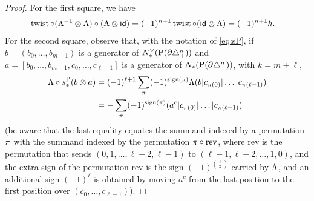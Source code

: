 \begin{proof}
	For the first square, we have
	\begin{align*}
		\operatorname{twist}\circ(\Lambda^{-1}\otimes \Lambda)\circ (\Lambda\otimes \mathsf{id})
		&= (-1)^{n+1} \operatorname{twist}\circ(\mathsf{id}\otimes \Lambda)
		= (-1)^{n+1} h.
	\end{align*}
	For the second square, observe that, with the notation of \eqref{eq:sP}, if $b = (b_0,\ldots,b_{m-1})$ is a generator of $N^\vee_{*}(\operatorname{P}(\partial\triangle_{+}^n))$ and $a = [b_0,\ldots,b_{m-1},c_0,\ldots,c_{\ell-1}]$ is a generator of $N_{*}(\operatorname{P}(\partial\triangle_{+}^n))$, with $k=m+\ell$,
	\begin{equation}\label{eq:lastsign}
		\begin{split}
			\Lambda\circ s_*^{\operatorname{P}} (b\otimes a)
			&= (-1)^{\ell+1}\sum_{\pi} (-1)^{\operatorname{sign}(\pi)} \Lambda(b|c_{\pi(0)}|\ldots|c_{\pi(\ell-1)})
			\\
			&= -\sum_{\pi} (-1)^{\operatorname{sign}(\pi)} (a^c|c_{\pi(0)}|\ldots|c_{\pi(\ell-1)})
		\end{split}
	\end{equation}
	(be aware that the last equality equates the summand indexed by a permutation $\pi$ with the summand indexed by the permutation $\pi\circ \mathrm{rev}$, where $\mathrm{rev}$ is the permutation that sends $(0,1,\ldots,\ell-2,\ell-1)$ to $(\ell-1,\ell-2,\ldots,1,0)$, and the extra sign of the permutation $\mathrm{rev}$ is the sign $(-1)^{\binom{\ell}{2}}$ carried by $\Lambda$, and an additional sign $(-1)^{\ell}$ is obtained by moving $a^c$ from the last position to the first position over $(c_0,\ldots,c_{\ell-1})$).


\end{proof}
